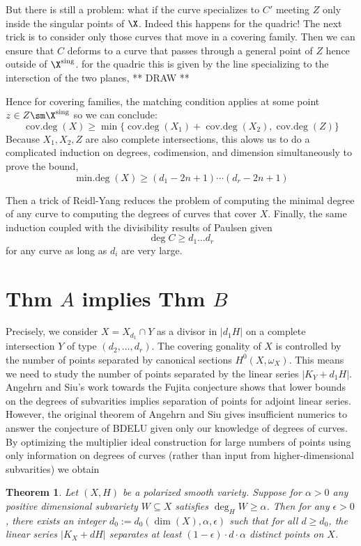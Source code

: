 \documentclass[12pt]{article}
\DeclareMathOperator{\covdeg}{\text{cov.deg}}
\theoremstyle{plain}
\newtheorem{Lthm}{Theorem}
\DeclareMathOperator{\mindeg}{min.deg}
\begin{document}
But there is still a problem: what if the curve specializes to $C'$ meeting $Z$ only inside the singular points of $\X$. Indeed this happens for the quadric! The next trick is to consider only those curves that move in a covering family. Then we can ensure that $C$ deforms to a curve that passes through a general point of $Z$ hence outside of $\X^{\text{sing}}$. {\color{red} for the quadric this is given by the line specializing to the intersction of the two planes, ** DRAW **}
\par 
Hence for covering families, the matching condition applies at some point $z \in Z \sm \X^{\text{sing}}$ so we can conclude:
\[ \covdeg(X) \ge \min \{ \covdeg(X_1) + \covdeg(X_2), \covdeg(Z) \} \]
Because $X_1, X_2, Z$ are also complete intersections, this alows us to do a complicated induction on degrees, codimension, and dimension simultaneously to prove the bound,
\[ \mindeg(X) \ge (d_1 - 2n + 1) \cdots (d_r - 2n + 1) \]

Then a trick of Reidl-Yang reduces the problem of computing the minimal degree of any curve to computing the degrees of curves that cover $X$. Finally, the same induction coupled with the divisibility results of Paulsen given
\[ \deg{C} \ge d_1 \dots d_r \]
for any curve as long as $d_i$ are very large.


\section{Thm $A$ implies Thm $B$}

Precisely, we consider $X = X_{d_1} \cap Y$ as a divisor in $|d_1 H|$ on a complete intersection  $Y$ of type $(d_2, \dots, d_{r})$. The covering gonality of $X$ is controlled by the number of points separated by canonical sections $H^0(X, \omega_X)$. This means we need to study the number of points separated by the linear series $|K_Y + d_1 H|$. Angehrn and
Siu's work towards the Fujita conjecture shows that lower bounds on the degrees of subvarities implies separation of points for adjoint linear series. However, the original theorem of Angehrn and Siu gives insufficient numerics to answer the conjecture of BDELU given only our knowledge of degrees of curves. By optimizing the multiplier ideal construction for large numbers of points using only information on degrees of curves (rather than input from higher-dimensional subvarities) we obtain

\newcommand{\reg}{\mathrm{reg}}

\begin{Lthm}
Let $(X, H)$ be a polarized smooth variety. Suppose for $\alpha > 0$ any positive dimensional subvariety $W \subseteq X$ satisfies $\deg_H{W} \ge \alpha$. Then for any $\epsilon > 0$, there exists an integer $d_0 := d_0(\dim(X), \alpha, \epsilon)$ such that for all $d \ge d_0$, the linear series $|K_X + d H|$ separates at least $(1 - \epsilon) \cdot d \cdot \alpha$ distinct points on $X$. 
\end{Lthm}
\end{document}
